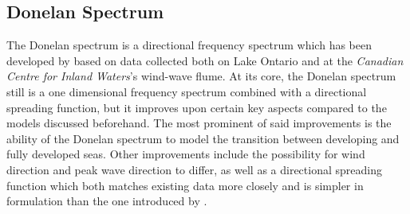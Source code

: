 \subsection{Donelan Spectrum}
%
The Donelan spectrum is a directional frequency spectrum which has 
been developed by \citet{article:Donelan1985} based on data 
collected both on Lake Ontario and at the \emph{Canadian Centre for Inland 
Waters}'s wind-wave flume. At its core, the Donelan spectrum still is a one 
dimensional frequency spectrum combined with a directional spreading function, 
but it improves upon certain key aspects compared to the models discussed 
beforehand. The most prominent of said improvements is the ability of the 
Donelan spectrum to model the transition between developing and fully developed 
seas. Other improvements include the possibility for wind direction and peak 
wave direction to differ, as well as a directional spreading function which both
matches existing data more closely and is simpler in formulation than the one 
introduced by \citet{article:Mitsuyasu1975}.

